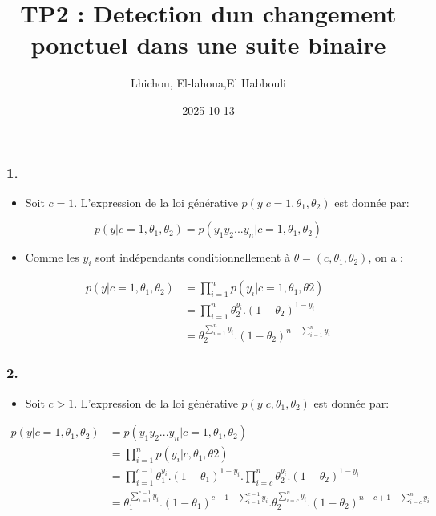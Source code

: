 \documentclass[
]{article}
\title{TP2 : Detection dun changement ponctuel dans une suite binaire}
\author{Lhichou, El-lahoua,El Habbouli}
\date{2025-10-13}
\providecommand{\tightlist}{%
  \setlength{\itemsep}{0pt}\setlength{\parskip}{0pt}}
\begin{document}
\maketitle

\subsubsection{1.}\label{section}

\begin{itemize}
\tightlist
\item
  Soit \(c=1\). L'expression de la loi générative
  \(p(y|c=1, \theta_1, \theta_2)\) est donnée par:
\end{itemize}

\[
p(y|c=1, \theta_1, \theta_2)=p(y_1y_2...y_n|c=1, \theta_1, \theta_2)
\]

\begin{itemize}
\tightlist
\item
  Comme les \(y_i\) sont indépendants conditionnellement à
  \(\theta=(c, \theta_1, \theta_2)\), on a :
\end{itemize}

\[
\begin{align}
p(y|c=1, \theta_1, \theta_2) &= \prod_{i=1}^n p(y_i|c=1, \theta_1, \theta2) \\
     &= \prod_{i=1}^n \theta_2^{y_i}.(1-\theta_2)^{1-y_i} \\
     &= \theta_2^{\sum_{i=1}^n y_i}.(1-\theta_2)^{n-\sum_{i=1}^n y_i}
\end{align}
\]

\subsubsection{2.}\label{section-1}

\begin{itemize}
\tightlist
\item
  Soit \(c>1\). L'expression de la loi générative
  \(p(y|c, \theta_1, \theta_2)\) est donnée par:
\end{itemize}

\[
\begin{align}
p(y|c=1, \theta_1, \theta_2)&=p(y_1y_2...y_n|c=1, \theta_1, \theta_2) \\
     &= \prod_{i=1}^n p(y_i|c, \theta_1, \theta2) \\
     &= \prod_{i=1}^{c-1} \theta_1^{y_i}.(1-\theta_1)^{1-y_i} . \prod_{i=c}^n \theta_2^{y_i}.(1-\theta_2)^{1-y_i}\\
     &= \theta_1^{\sum_{i=1}^{c-1} y_i}.(1-\theta_1)^{c-1-\sum_{i=1}^{c-1} y_i} . \theta_2^{\sum_{i=c}^n y_i}.(1-\theta_2)^{n-c+1-\sum_{i=c}^n y_i}
\end{align}
\]
\end{document}
